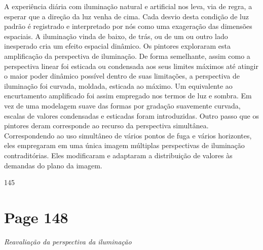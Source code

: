 \documentclass[a4paper]{article}
\begin{document}
A experiência diária com iluminação natural e artificial nos leva, via de regra, a esperar que a direção da luz venha de cima. Cada desvio desta condição de luz padrão é registrado e interpretado por nós como uma exageração das dimensões espaciais. A iluminação vinda de baixo, de trás, ou de um ou outro lado inesperado cria um efeito espacial dinâmico. Os pintores exploraram esta amplificação da perspectiva de iluminação. De forma semelhante, assim como a perspectiva linear foi esticada ou condensada aos seus limites máximos até atingir o maior poder dinâmico possível dentro de suas limitações, a perspectiva de iluminação foi curvada, moldada, esticada ao máximo. Um equivalente ao encurtamento amplificado foi assim empregado nos termos de luz e sombra. Em vez de uma modelagem suave das formas por gradação suavemente curvada, escalas de valores condensadas e esticadas foram introduzidas. Outro passo que os pintores deram corresponde ao recurso da perspectiva simultânea. Correspondendo ao uso simultâneo de vários pontos de fuga e vários horizontes, eles empregaram em uma única imagem múltiplas perspectivas de iluminação contraditórias. Eles modificaram e adaptaram a distribuição de valores às demandas do plano da imagem.\par
\vspace{2em}
\null\hfill 145\par

\newpage
\section*{Page 148}

\raggedright

\centering\textit{Reavaliação da perspectiva da iluminação}\par
\end{document}
